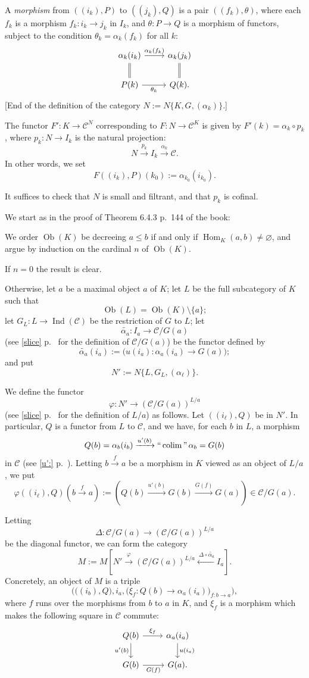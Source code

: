 \documentclass[12pt]{article}%
\theoremstyle{remark}
\theoremstyle{definition}
\newcommand{\C}{\mathcal C}
\newcommand{\pp}{\varphi}
\newcommand{\xr}{\xrightarrow}
\DeclareMathOperator*{\colim}{colim}%
\DeclareMathOperator*{\icolim}{``\colim"}
\DeclareMathOperator{\Hom}{Hom}%
\DeclareMathOperator{\Ind}{Ind}
\DeclareMathOperator{\Ob}{Ob}
\begin{document}
A \emph{morphism} from $((i_k),P)$ to $((j_k),Q)$ is a pair $((f_k),\theta)$, where each $f_k$ is a morphism $f_k:i_k\to j_k$ in $I_k$, and $\theta:P\to Q$ is a morphism of functors, subject to the condition $\theta_k=\alpha_k(f_k)$ for all $k$: 
$$ 
\begin{tikzcd} 
\alpha_k(i_k)\ar{r}{\alpha_k(f_k)}\ar[equal]{d}&\alpha_k(j_k)\ar[equal]{d}\\ 
P(k)\ar{r}[swap]{\theta_k}&Q(k).
\end{tikzcd} 
$$ 
[End of the definition of the category $N:=N\{K,G,(\alpha_k)\}$.] 

The functor $F':K\to\C^N$ corresponding to $F:N\to\C^K$ is given by $F'(k)=\alpha_k\circ p_k$, where $p_k:N\to I_k$ is the natural projection: 
$$
N\xr{p_k}I_k\xr{\alpha_k}\C.
$$ 
In other words, we set
$$
F((i_k),P)(k_0):=\alpha_{k_0}(i_{k_0}).
$$ 

It suffices to check that $N$ is small and filtrant, and that $p_k$ is cofinal. 

We start as in the proof of Theorem 6.4.3 p.~144 of the book: 

We order $\Ob(K)$ be decreeing $a\le b$ if and only if $\Hom_K(a,b)\neq\varnothing$, and argue by induction on the cardinal $n$ of $\Ob(K)$. 

If $n=0$ the result is clear.

Otherwise, let $a$ be a maximal object $a$ of $K$; let $L$ be the full subcategory of $K$ such that 
$$
\Ob(L)=\Ob(K)\setminus\{a\}; 
$$ 
let $G_L:L\to\Ind(\C)$ be the restriction of $G$ to $L$; let  
$$
\widetilde{\alpha_a}:I_a\to\C/G(a)
$$ 
(see \eqref{slice} p.~\pageref{slice} for the definition of $\C/G(a)$) be the functor defined by 
$$
\widetilde{\alpha_a}(i_a):=\big(u(i_a):\alpha_a(i_a)\to G(a)\big);
$$
and put 
$$
N':=N\{L,G_L,(\alpha_\ell)\}.
$$ 

We define the functor 
$$ 
\pp:N'\to(\C/G(a))^{L/a} 
$$ 
(see \eqref{slice} p.~\pageref{slice} for the definition of $L/a$) as follows. Let $((i_\ell),Q)$ be in $N'$. In particular, $Q$ is a functor from $L$ to $\C$, and we have, for each $b$ in $L$, a morphism 
$$
Q(b)=\alpha_b(i_b)\xr{u'(b)}\icolim\alpha_b=G(b) 
$$ 
in $\C$ (see \eqref{u':} p.~\pageref{u':}). Letting $b\xr f a$ be a morphism in $K$ viewed as an object of $L/a$, we put  
$$
\pp((i_\ell),Q)\left(b\xr f a\right):=\left(Q(b)\xr{u'(b)} G(b)\xr{G(f)}G(a)\right)\in\C/G(a).
$$

Letting 
$$
\Delta:\C/G(a)\to(\C/G(a))^{L/a}
$$ 
be the diagonal functor, we can form the category 
$$
M:=M\left[N'\xrightarrow{\pp}(\C/G(a))^{L/a}\xleftarrow{\ \Delta\circ\widetilde{\alpha_a}}I_a\right].
$$ 
Concretely, an object of $M$ is a triple 
$$
\Big(\big((i_b),Q\big),i_a,\big(\xi_f:Q(b)\to\alpha_a(i_a)\big)_{f:b\to a}\Big),
$$ 
where $f$ runs over the morphisms from $b$ to $a$ in $K$, and $\xi_f$ is a morphism which makes the following square in $\C$ commute: 
$$
\begin{tikzcd}
Q(b)\ar{r}{\xi_f}\ar{d}[swap]{u'(b)}&\alpha_a(i_a)\ar{d}{u(i_a)}\\ 
G(b)\ar{r}[swap]{G(f)}&G(a).
\end{tikzcd}
$$
\end{document}
